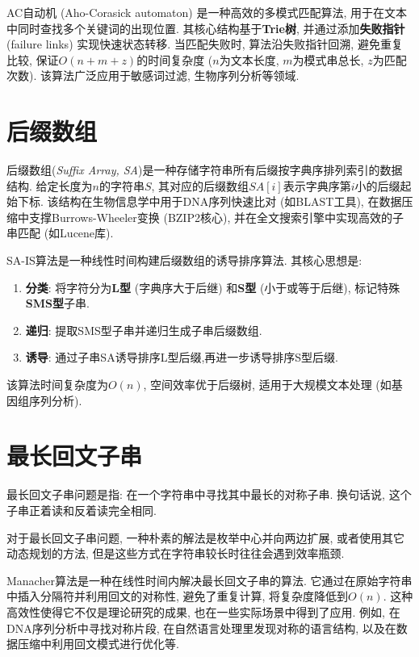 \documentclass[a4paper]{ctexbook}
\begin{document}
AC自动机 (Aho-Corasick automaton) 是一种高效的多模式匹配算法, 用于在文本中同时查找多个关键词的出现位置. 其核心结构基于\textbf{Trie树}, 并通过添加\textbf{失败指针} (failure links) 实现快速状态转移.
当匹配失败时, 算法沿失败指针回溯, 避免重复比较, 保证$O(n+m+z)$的时间复杂度 ($n$为文本长度, $m$为模式串总长, $z$为匹配次数). 该算法广泛应用于敏感词过滤, 生物序列分析等领域.



\section{后缀数组}

后缀数组(\textit{Suffix Array, SA})是一种存储字符串所有后缀按字典序排列索引的数据结构. 给定长度为$n$的字符串$S$, 其对应的后缀数组$SA[i]$表示字典序第$i$小的后缀起始下标. 该结构在生物信息学中用于DNA序列快速比对 (如BLAST工具), 在数据压缩中支撑Burrows-Wheeler变换 (BZIP2核心), 并在全文搜索引擎中实现高效的子串匹配 (如Lucene库).

SA-IS算法是一种线性时间构建后缀数组的诱导排序算法. 其核心思想是:
\begin{enumerate}
  \item \textbf{分类}: 将字符分为\textbf{L型} (字典序大于后继) 和\textbf{S型} (小于或等于后继), 标记特殊\textbf{SMS型}子串.
	\item \textbf{递归}: 提取SMS型子串并递归生成子串后缀数组.
	\item \textbf{诱导}: 通过子串SA诱导排序L型后缀,再进一步诱导排序S型后缀.
\end{enumerate}
该算法时间复杂度为$O(n)$, 空间效率优于后缀树, 适用于大规模文本处理 (如基因组序列分析).



\section{最长回文子串}

最长回文子串问题是指: 在一个字符串中寻找其中最长的对称子串. 换句话说, 这个子串正着读和反着读完全相同.

对于最长回文子串问题, 一种朴素的解法是枚举中心并向两边扩展, 或者使用其它动态规划的方法, 但是这些方式在字符串较长时往往会遇到效率瓶颈.

Manacher算法是一种在线性时间内解决最长回文子串的算法. 它通过在原始字符串中插入分隔符并利用回文的对称性, 避免了重复计算, 将复杂度降低到$O(n)$. 这种高效性使得它不仅是理论研究的成果, 也在一些实际场景中得到了应用. 例如, 在DNA序列分析中寻找对称片段, 在自然语言处理里发现对称的语言结构, 以及在数据压缩中利用回文模式进行优化等.
\end{document}
